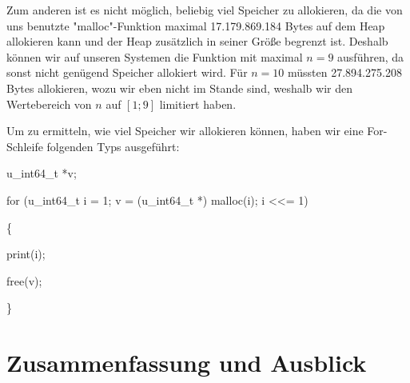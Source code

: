 \documentclass[course=asp]{aspdoc}
\begin{document}
Zum anderen ist es nicht möglich, beliebig viel Speicher zu allokieren, da die von uns benutzte  "malloc"-Funktion maximal 17.179.869.184 Bytes auf dem Heap allokieren kann und der Heap zusätzlich in seiner Größe begrenzt ist. Deshalb können wir auf unseren Systemen die Funktion mit maximal $n = 9$ ausführen, da sonst nicht genügend Speicher allokiert wird. Für $n = 10$ müssten 27.894.275.208 Bytes allokieren, wozu wir eben nicht im Stande sind, weshalb wir den Wertebereich von $n$ auf $[1;9]$ limitiert haben.

Um zu ermitteln, wie viel Speicher wir allokieren können, haben wir eine For-Schleife  folgenden Typs ausgeführt:

\begin{PseudoCode}	%
u\_int64\_t *v;    	


for (u\_int64\_t i = 1; v = (u\_int64\_t *) malloc(i); i <<= 1)   

  
\{     

    
print(i);  
	
	      
free(v);    
	
	 
\}
\end{PseudoCode}



\newpage
\section{Zusammenfassung und Ausblick}


{}
\end{document}

